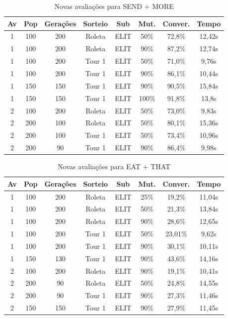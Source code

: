 \documentclass[a4paper, 12pt]{article}
\begin{document}
  \begin{table}[h]
    \centering
    \begin{tabular}{|c|c|c|c|c|c|c|c|}
      \hline
      Av & Pop & Gerações & Sorteio & Sub & Mut. & Conver. & Tempo  \\
      \hline
      1 & 100 & 200 & Roleta & ELIT & 50\% &72,8\% & 12,42s \\
      \hline
      1 & 100 & 200 & Roleta & ELIT & 90\% &87,2\% & 12,74s \\
      \hline
      1 & 100 & 200 & Tour 1 & ELIT & 50\% &71,0\% & 9,76s \\
      \hline
      1 & 100 & 200 & Tour 1 & ELIT & 90\% &86,1\% & 10,44s \\
      \hline
      1 & 150 & 150 & Tour 1 & ELIT & 90\% &90,5\% & 15,84s \\
      \hline
      1 & 150 & 150 & Tour 1 & ELIT & 100\% &91,8\% & 13,8s \\
      \hline
      2 & 100 & 200 & Roleta & ELIT & 50\% &73,0\% & 9,83s \\
      \hline
      2 & 200 & 100 & Roleta & ELIT & 50\% &80,1\% & 15,36s \\
      \hline
      2 & 200 & 100 & Tour 1 & ELIT & 50\% &73,4\% & 10,96s \\
      \hline
      2 & 200 & 90 & Tour 1 & ELIT & 90\% &86,4\% & 9,98s \\
      \hline
    \end{tabular}
    \caption{Novas avaliações para SEND + MORE}
    \label{tab:send}
  \end{table}

  \begin{table}[h]
    \centering
    \begin{tabular}{|c|c|c|c|c|c|c|c|}
      \hline
      Av & Pop & Gerações & Sorteio & Sub & Mut. & Conver. & Tempo  \\
      \hline
      1 & 100 & 200 & Roleta & ELIT & 25\% &19,2\% & 11,04s \\
      \hline
      1 & 100 & 200 & Roleta & ELIT & 50\% &21,3\% & 13,84s \\
      \hline
      1 & 100 & 200 & Roleta & ELIT & 90\% &28,6\% & 12,65s \\
      \hline
      1 & 100 & 200 & Tour 1 & ELIT & 50\% &23,01\% & 9,62s \\
      \hline
      1 & 100 & 200 & Tour 1 & ELIT & 90\% &30,1\% & 10,11s \\
      \hline
      1 & 150 & 130 & Tour 1 & ELIT & 90\% &43,6\% & 14,16s \\
      \hline
      2 & 100 & 200 & Roleta & ELIT & 90\% &19,1\% & 10,41s \\
      \hline
      2 & 200 & 90 & Roleta & ELIT & 50\% &24,8\% & 14,55s \\
      \hline
      2 & 200 & 90 & Tour 1 & ELIT & 90\% &27,3\% & 11,46s \\
      \hline
      2 & 150 & 150 & Tour 1 & ELIT & 90\% &27,9\% & 11,45s \\
      \hline
    \end{tabular}
    \caption{Novas avaliações para EAT + THAT}
    \label{tab:eat}
  \end{table}
\end{document}
